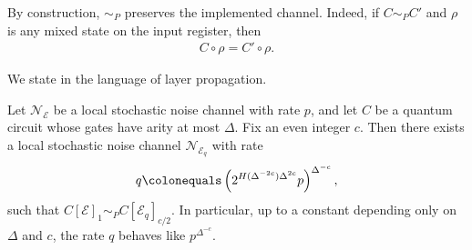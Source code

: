 \documentclass[manuscript,screen,review]{acmart}
\begin{document}
By construction, $\sim_{P}$ preserves the implemented channel. Indeed, if $C\sim_{P}C'$ and $\rho$ is any mixed state on the input register, then
\begin{equation*}
  \begin{split}
    C\circ \rho = C'\circ \rho.
  \end{split}
\end{equation*}

We state  in the language of layer propagation.
\begin{claim}
  \label{claim:block_noise_renorm_app}
  Let $\mathcal{N}_{\mathcal{E}}$ be a local stochastic noise channel with rate $p$, and let $C$ be a quantum circuit whose gates have arity at most $\Delta$. Fix an even integer $c$. Then there exists a local stochastic noise channel $\mathcal{N}_{\mathcal{E}_{q}}$ with rate
  \begin{equation*}
    \begin{split}
      q \colonequals \left(2^{H(\Delta^{-2c})\Delta^{2c}}p\right)^{\Delta^{-c}},
    \end{split}
  \end{equation*}
  such that $C[\mathcal{E}]_{1} \sim_{P} C[\mathcal{E}_{q}]_{c/2}$. In particular, up to a constant depending only on $\Delta$ and $c$, the rate $q$ behaves like $p^{\Delta^{-c}}$.
\end{claim}
\end{document}

